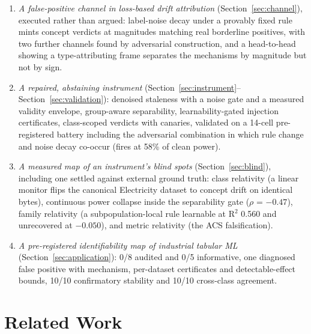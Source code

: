 \documentclass[10pt]{article} %
\begin{document}
\begin{enumerate}
\item \emph{A false-positive channel in loss-based drift attribution} (Section~\ref{sec:channel}), executed rather than argued:
label-noise decay under a provably fixed rule mints concept verdicts at magnitudes matching real
borderline positives, with two further channels found by adversarial construction, and a
head-to-head showing a type-attributing frame separates the mechanisms by magnitude but not by
sign.
\item \emph{A repaired, abstaining instrument} (Section~\ref{sec:instrument}--Section~\ref{sec:validation}): denoised staleness with a noise gate and a measured
validity envelope, group-aware separability, learnability-gated injection certificates,
class-scoped verdicts with canaries, validated on a 14-cell pre-registered battery including
the adversarial combination in which rule change and noise decay co-occur (fires at 58\% of
clean power).
\item \emph{A measured map of an instrument's blind spots} (Section~\ref{sec:blind}), including one settled against external
ground truth: class relativity (a linear monitor flips the canonical Electricity dataset to
concept drift on identical bytes), continuous power collapse inside the separability gate
($\rho$ = $-0.47$), family relativity (a subpopulation-local rule learnable at R$^2$ 0.560 and
unrecovered at $-0.050$), and metric relativity (the ACS falsification).
\item \emph{A pre-registered identifiability map of industrial tabular ML} (Section~\ref{sec:application}): 0/8 audited and 0/5
informative, one diagnosed false positive with mechanism, per-dataset certificates and
detectable-effect bounds, 10/10 confirmatory stability and 10/10 cross-class agreement.
\end{enumerate}

\section{Related Work}\label{sec:related}
\end{document}
